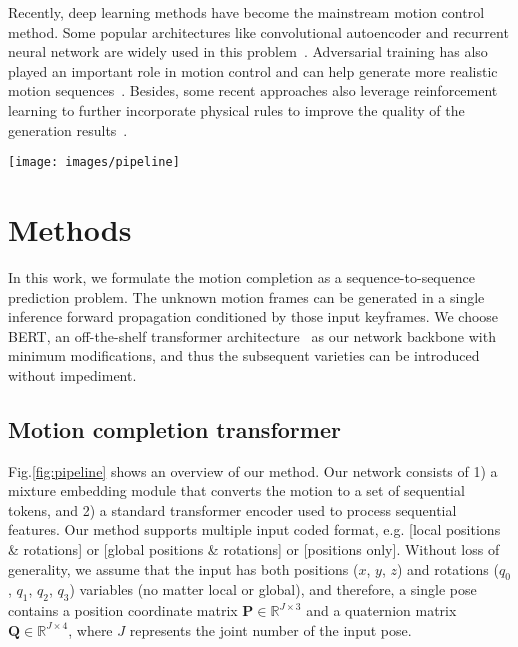 \documentclass[10pt,twocolumn,letterpaper]{article}
\begin{document}
Recently, deep learning methods have become the mainstream motion control method. Some popular architectures like convolutional autoencoder and recurrent neural network are widely used in this problem~\cite{holden2015learning, holden2016deep, holden2017phase,lee2018interactive}. Adversarial training has also played an important role in motion control and can help generate more realistic motion sequences~\cite{barsoum2018hp, gui2018adversarial, harvey2020robust}. Besides, some recent approaches also leverage reinforcement learning to further incorporate physical rules to improve the quality of the generation results~\cite{coros2009robust, yin2007simbicon,baram2016model, peng2017deeploco,peng2018deepmimic,bergamin2019drecon}.

\begin{figure*}[ht]
  \centering
  \texttt{[image: images/pipeline]}
  \caption{An overview of our method. Our method consists of a standard transformer encoder, a mixture embedding layer and input/output convolutional heads. In motion completion, the unknown input frames are first generated by using linear interpolation ({\color{red} shown in red}) before being fed to the model. Our method takes in a whole masked sequence and complete the prediction within only a single forward propagation.}
  \label{fig:pipeline}
\end{figure*}


\section{Methods}

In this work, we formulate the motion completion as a sequence-to-sequence prediction problem. The unknown motion frames can be generated in a single inference forward propagation conditioned by those input keyframes. We choose BERT, an off-the-shelf transformer architecture~\cite{devlin2018bert} as our network backbone with minimum modifications, and thus the subsequent varieties can be introduced without impediment.

\subsection{Motion completion transformer} \label{sec:mocot}

Fig.\ref{fig:pipeline} shows an overview of our method. Our network consists of 1) a mixture embedding module that converts the motion to a set of sequential tokens, and 2) a standard transformer encoder used to process sequential features. Our method supports multiple input coded format, e.g. [local positions \& rotations] or [global positions \& rotations] or [positions only]. Without loss of generality, we assume that the input has both positions ($x$, $y$, $z$) and rotations ($q_0$, $q_1$, $q_2$, $q_3$) variables (no matter local or global), and therefore, a single pose contains a position coordinate matrix $\bm{P} \in \mathbb{R}^{J\times3}$ and a quaternion matrix $\bm{Q} \in \mathbb{R}^{J\times4}$, where $J$ represents the joint number of the input pose.
\end{document}
